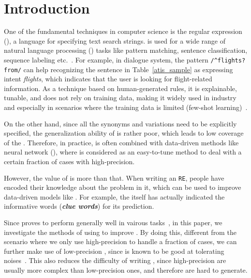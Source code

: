 \section{Introduction}


One of the fundamental techniques in computer science is the regular expression (\RE), a language for specifying text search strings.  \RE is used for a wide range of natural language processing (\NLP) tasks like pattern matching, sentence classification, sequence labeling etc.~\cite{chang2014tokensregex}. 
For example, in dialogue system, the \RE pattern \texttt{/\textasciicircum flights? from/} can help
recognizing the sentence in Table~\ref{atis_sample} as expressing intent \emph{flights}, which indicates that the user is looking for
flight-related information. As a technique based on human-generated rules, it is explainable, tunable, and does not rely on training data,
making it widely used in industry and especially in scenarios where the training data is limited (few-shot learning)~\cite{gc2015big}.

On the other hand, since all the synonyms and variations need to be explicitly specified, the generalization ability of \RE is rather poor,
which leads to low coverage of the \REs. Therefore, in practice, \RE is often combined with data-driven methods like neural network
(\NN), where \RE is considered as an easy-to-tune method to deal with a certain fraction of cases with high-precision.

However, the value of \RE is more than that. When writing an \texttt{RE}, people have encoded their knowledge about the problem in it, which can be used to improve data-driven models like \NN. For example, the \RE itself has actually indicated the informative words
(\textbf{\emph{clue words}}) for its prediction.

Since \NN proves to perform generally well in vairous \NLP tasks~\cite{goldberg2017neural}, in this paper,
we investigate the methods of using \RE to improve \NN. By doing this, different from the scenario where we only use high-precision
\REs to handle a fraction of cases, we can further make use of low-precision \REs, since \NN is known to be good at
tolerating noises~\cite{xie2016disturblabel}. This also reduces the difficulty of writing \REs, since high-precision \REs
are usually more complex than low-precision ones, and therefore are hard to generate.


